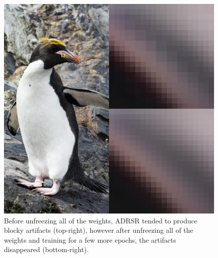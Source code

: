 \documentclass[10pt,twocolumn,letterpaper]{article}
\begin{document}
\begin{figure}[htbp]
	    \centering
	    \includegraphics[width=\columnwidth]{Images/blockyup.png}
	    \caption{Before unfreezing all of the weights, ADRSR tended to produce blocky artifacts (top-right), however after unfreezing all of the weights and training for a few more epochs, the artifacts disappeared (bottom-right).}
	    \label{fig:blockyup}
\end{figure}
\end{document}
